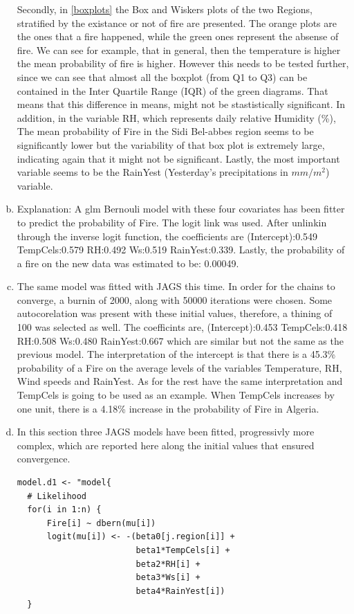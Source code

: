 \documentclass[12pt,a4paper]{article}
\begin{document}
\begin{enumerate}[(a)]
Secondly, in \autoref{boxplots} the Box and Wiskers plots of the two Regions, stratified by the existance or not of fire are presented. The orange plots are the ones that a fire happened, while the green ones represent the absense of fire. We can see for example, that in general, then the temperature is higher the mean probability of fire is higher. However this needs to be tested further, since we can see that almost all the boxplot (from Q1 to Q3) can be contained in the Inter Quartile Range (IQR) of the green diagrams. That means that this difference in means, might not be stastistically significant. In addition, in the variable RH, which represents daily relative Humidity (\%), The mean probability of Fire in the Sidi Bel-abbes region seems to be significantly lower but the variability of that box plot is extremely large, indicating again that it might not be significant. Lastly, the most important variable seems to be the RainYest (Yesterday's precipitations in $mm/m^2$) variable.

\item
Explanation: A glm Bernouli model with these four covariates has been fitter to predict the probability of Fire. The logit link was used. After unlinkin through the inverse logit function, the coefficients are (Intercept):0.549 TempCels:0.579 RH:0.492 Ws:0.519 RainYest:0.339. 
Lastly, the probability of a fire on the new data was estimated to be: 0.00049. 

\item
The same model was fitted with JAGS this time. In order for the chains to converge, a burnin of 2000, along with 50000 iterations were chosen. Some autocorelation was present with these initial values, therefore, a thining of 100 was selected as well. The coefficints are, (Intercept):0.453 TempCels:0.418 RH:0.508 Ws:0.480 RainYest:0.667 which are similar but not the same as the previous model. The interpretation of the intercept is that there is a 45.3\% probability of a Fire on the average levels of the variables Temperature, RH, Wind speeds and RainYest. As for the rest have the same interpretation and TempCels is going to be used as an example. When TempCels increases by one unit, there is a 4.18\% increase in the probability of Fire in Algeria.

\item
In this section three JAGS models have been fitted, progressivly more complex, which are reported here along the initial values that ensured convergence. 

\begin{verbatim}
model.d1 <- "model{
  # Likelihood
  for(i in 1:n) {
      Fire[i] ~ dbern(mu[i])
      logit(mu[i]) <- -(beta0[j.region[i]] + 
                        beta1*TempCels[i] + 
                        beta2*RH[i] + 
                        beta3*Ws[i] + 
                        beta4*RainYest[i])
  }
  

\end{verbatim}
\end{enumerate}
\end{document}
